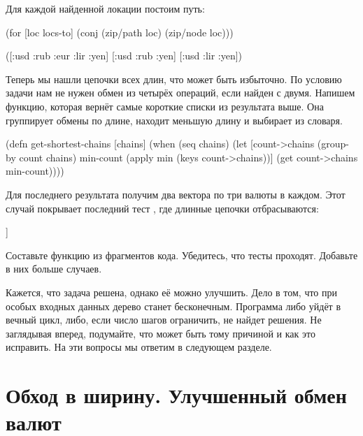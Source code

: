 Для каждой найденной локации постоим путь:

\begin{english}
  \begin{clojure}
(for [loc locs-to]
  (conj (zip/path loc) (zip/node loc)))

([:usd :rub :eur :lir :yen]
 [:usd :rub :yen]
 [:usd :lir :yen])
  \end{clojure}
\end{english}

Теперь мы нашли цепочки всех длин, что может быть избыточно. По условию задачи
нам не нужен обмен из четырёх операций, если найден с двумя. Напишем функцию,
которая вернёт самые короткие списки из результата выше. Она группирует обмены
по длине, находит меньшую длину и выбирает из словаря.

\begin{english}
  \begin{clojure}
(defn get-shortest-chains
  [chains]
  (when (seq chains)
    (let [count->chains (group-by count chains)
          min-count (apply min (keys count->chains))]
      (get count->chains min-count))))
  \end{clojure}
\end{english}

Для последнего результата получим два вектора по три валюты в каждом. Этот
случай покрывает последний тест , где длинные цепочки
отбрасываются:

\begin{english}
  \begin{clojure}
[[:usd :rub :yen] [:usd :lir :yen]]
  \end{clojure}
\end{english}

Составьте функцию  из фрагментов кода. Убедитесь, что тесты
проходят. Добавьте в них больше случаев.

Кажется, что задача решена, однако её можно улучшить. Дело в том, что при особых
входных данных дерево станет бесконечным. Программа либо уйдёт в вечный цикл,
либо, если число шагов ограничить, не найдет решения. Не заглядывая вперед,
подумайте, что может быть тому причиной и как это исправить. На эти вопросы мы
ответим в следующем разделе.

\section{Обход в ширину. Улучшенный обмен валют}

